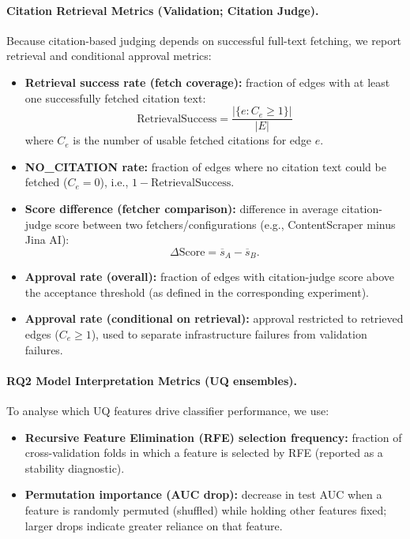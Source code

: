 \paragraph{Citation Retrieval Metrics (Validation; Citation Judge).}
Because citation-based judging depends on successful full-text fetching, we report retrieval and conditional approval metrics:
\begin{itemize}[noitemsep]
    \item \textbf{Retrieval success rate (fetch coverage):} fraction of edges with at least one successfully fetched citation text:
    \begin{equation}
        \text{RetrievalSuccess} = \frac{|\{e : C_e \ge 1\}|}{|E|}
    \end{equation}
    where $C_e$ is the number of usable fetched citations for edge $e$.
    \item \textbf{NO\_CITATION rate:} fraction of edges where no citation text could be fetched ($C_e = 0$), i.e., $1-\text{RetrievalSuccess}$.
    \item \textbf{Score difference (fetcher comparison):} difference in average citation-judge score between two fetchers/configurations (e.g., ContentScraper minus Jina AI):
    \begin{equation}
        \Delta \text{Score} = \overline{s}_{A} - \overline{s}_{B}.
    \end{equation}
    \item \textbf{Approval rate (overall):} fraction of edges with citation-judge score above the acceptance threshold (as defined in the corresponding experiment).
    \item \textbf{Approval rate (conditional on retrieval):} approval restricted to retrieved edges ($C_e \ge 1$), used to separate infrastructure failures from validation failures.
\end{itemize}

\paragraph{RQ2 Model Interpretation Metrics (UQ ensembles).}
To analyse which UQ features drive classifier performance, we use:
\begin{itemize}[noitemsep]
    \item \textbf{Recursive Feature Elimination (RFE) selection frequency:} fraction of cross-validation folds in which a feature is selected by RFE (reported as a stability diagnostic).
    \item \textbf{Permutation importance (AUC drop):} decrease in test AUC when a feature is randomly permuted (shuffled) while holding other features fixed; larger drops indicate greater reliance on that feature.
\end{itemize}

